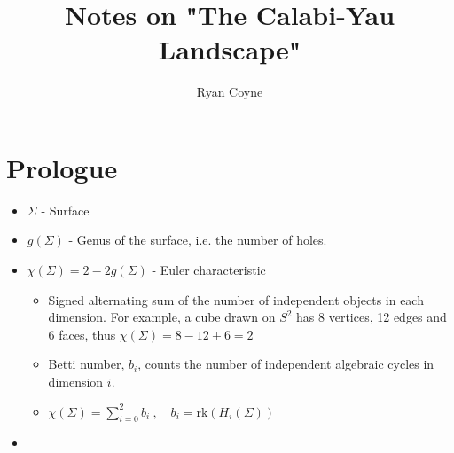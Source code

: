 \documentclass[12pt]{article}
\begin{document}
    \title{Notes on "The Calabi-Yau Landscape"}
    \author{Ryan Coyne}
    \date{}
    \maketitle
    \section{Prologue}
    \begin{itemize}
        \item \(\Sigma\) - Surface
        \item \(g(\Sigma)\) - Genus of the surface, i.e. the number of holes.
        \item \(\chi(\Sigma) = 2 - 2g(\Sigma)\) - Euler characteristic
        \begin{itemize}
            \item Signed alternating sum of the number of independent objects in each dimension. For example, a cube drawn on \(S^2\) has 8 vertices, 12 edges and 6 faces, thus \(\chi(\Sigma) = 8 - 12 + 6 = 2\)
            \item Betti number, \(b_i\), counts the number of independent algebraic cycles in dimension \(i\).
            \item \(\chi(\Sigma) = \sum_{i=0}^2b_i\ ,\quad b_i = \mathrm{rk}(H_i(\Sigma))\)
        \end{itemize}
        \item 
    \end{itemize}
\end{document}
